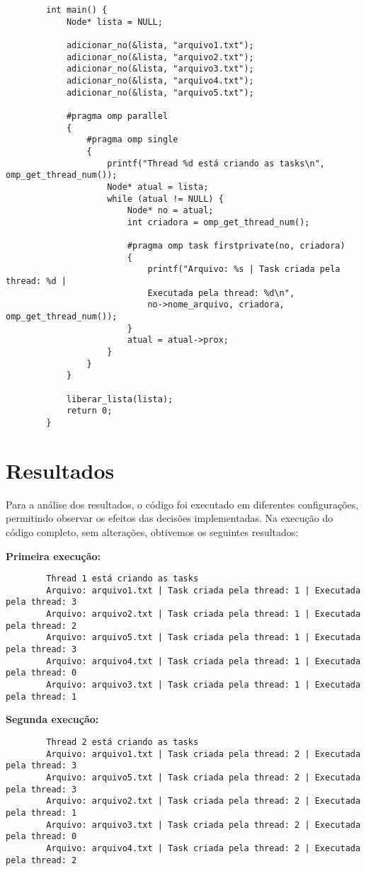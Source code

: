 \documentclass[a4paper, 12pt]{article}
\begin{document}
	\begin{verbatim}
		int main() {
		    Node* lista = NULL;
			
		    adicionar_no(&lista, "arquivo1.txt");
		    adicionar_no(&lista, "arquivo2.txt");
		    adicionar_no(&lista, "arquivo3.txt");
		    adicionar_no(&lista, "arquivo4.txt");
		    adicionar_no(&lista, "arquivo5.txt");
			
		    #pragma omp parallel
		    {
		        #pragma omp single
		        {
		            printf("Thread %d está criando as tasks\n", omp_get_thread_num());
		            Node* atual = lista;
		            while (atual != NULL) {
		                Node* no = atual;
		                int criadora = omp_get_thread_num();
						
		                #pragma omp task firstprivate(no, criadora)
		                {
		                    printf("Arquivo: %s | Task criada pela thread: %d | 
		                    Executada pela thread: %d\n",
		                    no->nome_arquivo, criadora, omp_get_thread_num());
		                }
		                atual = atual->prox;
		            }
	        	}
		    }
			
		    liberar_lista(lista);
		    return 0;
		}
	\end{verbatim}
	
	\section{Resultados}
	
	\hspace{0.7cm}Para a análise dos resultados, o código foi executado em diferentes configurações, permitindo observar os efeitos das decisões implementadas. Na execução do código completo, sem alterações, obtivemos os seguintes resultados:
	
	\textbf{Primeira execução:}
	\begin{verbatim}
		Thread 1 está criando as tasks
		Arquivo: arquivo1.txt | Task criada pela thread: 1 | Executada pela thread: 3
		Arquivo: arquivo2.txt | Task criada pela thread: 1 | Executada pela thread: 2
		Arquivo: arquivo5.txt | Task criada pela thread: 1 | Executada pela thread: 3
		Arquivo: arquivo4.txt | Task criada pela thread: 1 | Executada pela thread: 0
		Arquivo: arquivo3.txt | Task criada pela thread: 1 | Executada pela thread: 1
	\end{verbatim}
	
	\textbf{Segunda execução:}
	\begin{verbatim}
		Thread 2 está criando as tasks
		Arquivo: arquivo1.txt | Task criada pela thread: 2 | Executada pela thread: 3
		Arquivo: arquivo5.txt | Task criada pela thread: 2 | Executada pela thread: 3
		Arquivo: arquivo2.txt | Task criada pela thread: 2 | Executada pela thread: 1
		Arquivo: arquivo3.txt | Task criada pela thread: 2 | Executada pela thread: 0
		Arquivo: arquivo4.txt | Task criada pela thread: 2 | Executada pela thread: 2
	\end{verbatim}
	
\end{document}
